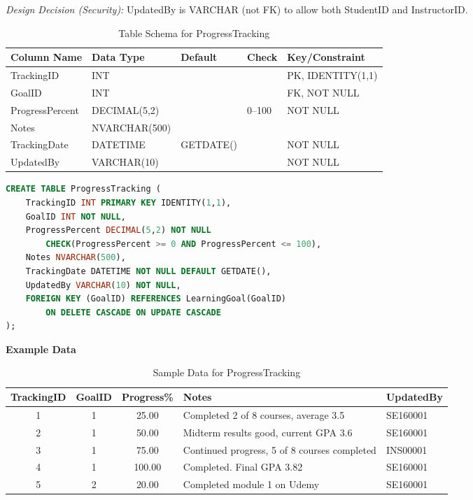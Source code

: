 \documentclass[12pt,a4paper]{report}
\begin{document}
\textit{Design Decision (Security):} UpdatedBy is VARCHAR (not FK) to allow both StudentID and InstructorID.

\begin{table}[ht]
\centering
\small
\begin{tabular}{|l|l|l|l|l|}
\hline
\textbf{Column Name} & \textbf{Data Type} & \textbf{Default} & \textbf{Check} & \textbf{Key/Constraint} \\ \hline
TrackingID & INT & & & PK, IDENTITY(1,1) \\ \hline
GoalID & INT & & & FK, NOT NULL \\ \hline
ProgressPercent & DECIMAL(5,2) & & 0--100 & NOT NULL \\ \hline
Notes & NVARCHAR(500) & & & \\ \hline
TrackingDate & DATETIME & GETDATE() & & NOT NULL \\ \hline
UpdatedBy & VARCHAR(10) & & & NOT NULL \\ \hline
\end{tabular}
\caption{Table Schema for ProgressTracking}
\label{tab:progress_tracking_schema}
\end{table}

\begin{lstlisting}[language=SQL, caption=Create Table ProgressTracking]
CREATE TABLE ProgressTracking (
    TrackingID INT PRIMARY KEY IDENTITY(1,1),
    GoalID INT NOT NULL,
    ProgressPercent DECIMAL(5,2) NOT NULL 
        CHECK(ProgressPercent >= 0 AND ProgressPercent <= 100),
    Notes NVARCHAR(500),
    TrackingDate DATETIME NOT NULL DEFAULT GETDATE(),
    UpdatedBy VARCHAR(10) NOT NULL,
    FOREIGN KEY (GoalID) REFERENCES LearningGoal(GoalID) 
        ON DELETE CASCADE ON UPDATE CASCADE
);
\end{lstlisting}

\textbf{Example Data}

\begin{table}[ht]
\centering
\small
\begin{tabular}{|c|c|c|p{8cm}|l|}
\hline
\textbf{TrackingID} & \textbf{GoalID} & \textbf{Progress\%} & \textbf{Notes} & \textbf{UpdatedBy} \\ \hline
1 & 1 & 25.00 & Completed 2 of 8 courses, average 3.5 & SE160001 \\ \hline
2 & 1 & 50.00 & Midterm results good, current GPA 3.6 & SE160001 \\ \hline
3 & 1 & 75.00 & Continued progress, 5 of 8 courses completed & INS00001 \\ \hline
4 & 1 & 100.00 & Completed. Final GPA 3.82 & SE160001 \\ \hline
5 & 2 & 20.00 & Completed module 1 on Udemy & SE160001 \\ \hline
\end{tabular}
\caption{Sample Data for ProgressTracking}
\label{tab:progress_tracking_data}
\end{table}
\end{document}
